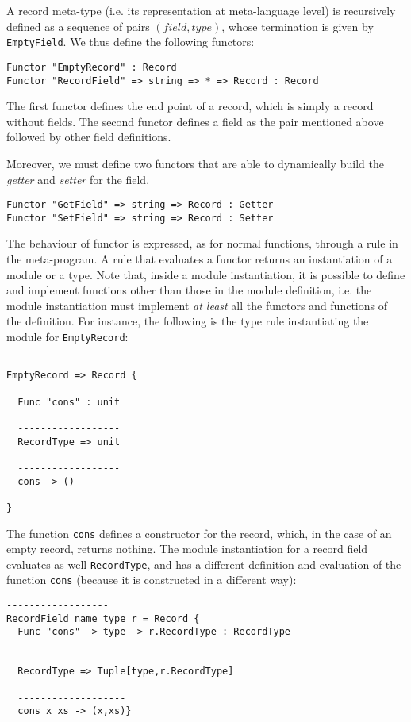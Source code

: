 A record meta-type (i.e. its representation at meta-language level) is recursively defined as a sequence of pairs $(field,type)$, whose termination is given by \texttt{EmptyField}. We thus define the following functors:

\begin{lstlisting}
Functor "EmptyRecord" : Record
Functor "RecordField" => string => * => Record : Record
\end{lstlisting}

\noindent
The first functor defines the end point of a record, which is simply a record without fields. The second functor defines a field as the pair mentioned above followed by other field definitions.

Moreover, we must define two functors that are able to dynamically build the \textit{getter} and \textit{setter} for the field.

\begin{lstlisting}
Functor "GetField" => string => Record : Getter
Functor "SetField" => string => Record : Setter
\end{lstlisting}

The behaviour of functor is expressed, as for normal functions, through a rule in the meta-program. A rule that evaluates a functor returns an instantiation of a module or a type. Note that, inside a module instantiation, it is possible to define and implement functions other than those in the module definition, i.e. the module instantiation must implement \textit{at least} all the functors and functions of the definition. For instance, the following is the type rule instantiating the module for \texttt{EmptyRecord}:

\begin{lstlisting}
-------------------
EmptyRecord => Record {

  Func "cons" : unit

  ------------------
  RecordType => unit

  ------------------
  cons -> ()

}
\end{lstlisting}

\noindent
The function \texttt{cons} defines a constructor for the record, which, in the case of an empty record, returns nothing. The module instantiation for a record field evaluates as well \texttt{RecordType}, and has a different definition and evaluation of the function \texttt{cons} (because it is constructed in a different way):

\begin{lstlisting}
------------------
RecordField name type r = Record {
  Func "cons" -> type -> r.RecordType : RecordType
  
  ---------------------------------------
  RecordType => Tuple[type,r.RecordType]
  
  -------------------
  cons x xs -> (x,xs)} 
\end{lstlisting}

